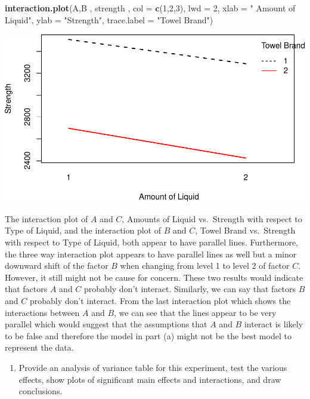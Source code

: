 \documentclass[12pt,]{article}
\newenvironment{Shaded}{\begin{snugshade}}{\end{snugshade}}
\newcommand{\KeywordTok}[1]{\textcolor[rgb]{0.13,0.29,0.53}{\textbf{#1}}}
\newcommand{\DataTypeTok}[1]{\textcolor[rgb]{0.13,0.29,0.53}{#1}}
\newcommand{\DecValTok}[1]{\textcolor[rgb]{0.00,0.00,0.81}{#1}}
\newcommand{\StringTok}[1]{\textcolor[rgb]{0.31,0.60,0.02}{#1}}
\newcommand{\NormalTok}[1]{#1}
\providecommand{\tightlist}{%
  \setlength{\itemsep}{0pt}\setlength{\parskip}{0pt}}
\begin{document}
\begin{Shaded}
\begin{Highlighting}[]
\KeywordTok{interaction.plot}\NormalTok{(A,B , strength , }\DataTypeTok{col =} \KeywordTok{c}\NormalTok{(}\DecValTok{1}\NormalTok{,}\DecValTok{2}\NormalTok{,}\DecValTok{3}\NormalTok{), }\DataTypeTok{lwd =} \DecValTok{2}\NormalTok{, }\DataTypeTok{xlab =} \StringTok{" Amount of Liquid"}\NormalTok{,}
                 \DataTypeTok{ylab =} \StringTok{"Strength"}\NormalTok{, }\DataTypeTok{trace.label =} \StringTok{"Towel Brand"}\NormalTok{)}
\end{Highlighting}
\end{Shaded}

\includegraphics{Markdown_HW_7_files/figure-latex/unnamed-chunk-2-4.pdf}

The interaction plot of \(A\) and \(C\), Amounts of Liquid vs.~Strength
with respect to Type of Liquid, and the interaction plot of \(B\) and
\(C\), Towel Brand vs.~Strength with respect to Type of Liquid, both
appear to have parallel lines. Furthermore, the three way interaction
plot appears to have parallel lines as well but a minor downward shift
of the factor \(B\) when changing from level 1 to level 2 of factor
\(C\). However, it still might not be cause for concern. These two
results would indicate that factors \(A\) and \(C\) probably don't
interact. Similarly, we can say that factors \(B\) and \(C\) probably
don't interact. From the last interaction plot which shows the
interactions between \(A\) and \(B\), we can see that the lines appear
to be very parallel which would suggest that the assumptions that \(A\)
and \(B\) interact is likely to be false and therefore the model in part
(a) might not be the best model to represent the data.

\begin{enumerate}
\def\labelenumi{(\alph{enumi})}
\setcounter{enumi}{3}
\tightlist
\item
  Provide an analysis of variance table for this experiment, test the
  various effects, show plots of significant main effects and
  interactions, and draw conclusions.
\end{enumerate}
\end{document}
